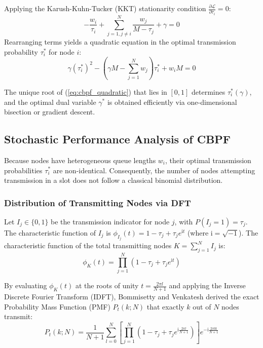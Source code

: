 Applying the Karush-Kuhn-Tucker (KKT) stationarity condition $\frac{\partial \mathcal{L}}{\partial \tau_i} = 0$:
\begin{equation}
    -\frac{w_i}{\tau_i} + \sum_{j=1, j \ne i}^N \frac{w_j}{M - \tau_j} + \gamma = 0
\end{equation}
Rearranging terms yields a quadratic equation in the optimal transmission probability $\tau_i^*$ for node $i$:
\begin{equation}
    \label{eq:cbpf_quadratic}
    \gamma (\tau_i^*)^2 - \left( \gamma M - \sum_{j=1}^N w_j \right) \tau_i^* + w_i M = 0
\end{equation}

The unique root of (\ref{eq:cbpf_quadratic}) that lies in $[0, 1]$ determines $\tau_i^*(\gamma)$, and the optimal dual variable $\gamma^*$ is obtained efficiently via one-dimensional bisection or gradient descent.

\subsection{Stochastic Performance Analysis of CBPF}
Because nodes have heterogeneous queue lengths $w_i$, their optimal transmission probabilities $\tau_i^*$ are non-identical. Consequently, the number of nodes attempting transmission in a slot does not follow a classical binomial distribution.

\subsubsection{Distribution of Transmitting Nodes via DFT}
Let $I_j \in \{0, 1\}$ be the transmission indicator for node $j$, with $P(I_j = 1) = \tau_j$. The characteristic function of $I_j$ is $\phi_{I_j}(t) = 1 - \tau_j + \tau_j e^{\mathrm{i} t}$ (where $\mathrm{i} = \sqrt{-1}$). The characteristic function of the total transmitting nodes $K = \sum_{j=1}^N I_j$ is:
\begin{equation}
    \phi_K(t) = \prod_{j=1}^N \left( 1 - \tau_j + \tau_j e^{\mathrm{i} t} \right)
\end{equation}

By evaluating $\phi_K(t)$ at the roots of unity $t = \frac{2\pi l}{N+1}$ and applying the Inverse Discrete Fourier Transform (IDFT), Bommisetty and Venkatesh \cite{bommisetty2023cbpf} derived the exact Probability Mass Function (PMF) $P_t(k; N)$ that exactly $k$ out of $N$ nodes transmit:
\begin{equation}
    P_t(k; N) = \frac{1}{N+1} \sum_{l=0}^N \left[ \prod_{j=1}^N \left( 1 - \tau_j + \tau_j e^{\mathrm{i} \frac{2\pi l}{N+1}} \right) \right] e^{-\mathrm{i} \frac{2\pi l k}{N+1}}
\end{equation}

